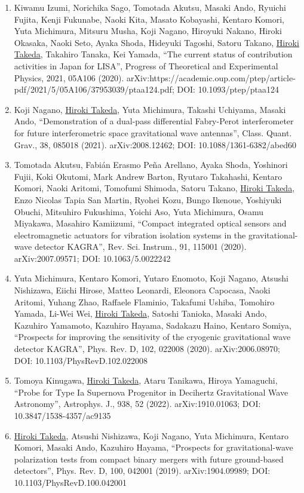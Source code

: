 \documentclass[uplatex, 11pt]{jsarticle}
\begin{document}
\begin{enumerate}
\item Kiwamu Izumi, Norichika Sago, Tomotada Akutsu, Masaki Ando, Ryuichi Fujita, Kenji Fukunabe, Naoki Kita, Masato Kobayashi, Kentaro Komori, Yuta Michimura, Mitsuru Musha, Koji Nagano, Hiroyuki Nakano, Hiroki Okasaka, Naoki Seto, Ayaka Shoda, Hideyuki Tagoshi, Satoru Takano, \uline{Hiroki Takeda}, Takahiro Tanaka, Kei Yamada, “The current status of contribution activities in Japan for LISA”, Progress of Theoretical and Experimental Physics, 2021, 05A106 (2020). arXiv:https://academic.oup.com/ptep/article-pdf/2021/5/05A106/37953039/ptaa124.pdf; DOI: 10.1093/ptep/ptaa124
\item Koji Nagano, \uline{Hiroki Takeda}, Yuta Michimura, Takashi Uchiyama, Masaki Ando, “Demonstration of a dual-pass differential Fabry-Perot interferometer for future interferometric space gravitational wave antennas”, Class. Quant. Grav., 38, 085018 (2021). arXiv:2008.12462; DOI: 10.1088/1361-6382/abed60
\item Tomotada Akutsu, Fabián Erasmo Peña Arellano, Ayaka Shoda, Yoshinori Fujii, Koki Okutomi, Mark Andrew Barton, Ryutaro Takahashi, Kentaro Komori, Naoki Aritomi, Tomofumi Shimoda, Satoru Takano, \uline{Hiroki Takeda}, Enzo Nicolas Tapia San Martin, Ryohei Kozu, Bungo Ikenoue, Yoshiyuki Obuchi, Mitsuhiro Fukushima, Yoichi Aso, Yuta Michimura, Osamu Miyakawa, Masahiro Kamiizumi, “Compact integrated optical sensors and electromagnetic actuators for vibration isolation systems in the gravitational-wave detector KAGRA”, Rev. Sci. Instrum., 91, 115001 (2020). arXiv:2007.09571; DOI: 10.1063/5.0022242
\item Yuta Michimura, Kentaro Komori, Yutaro Enomoto, Koji Nagano, Atsushi Nishizawa, Eiichi Hirose, Matteo Leonardi, Eleonora Capocasa, Naoki Aritomi, Yuhang Zhao, Raffaele Flaminio, Takafumi Ushiba, Tomohiro Yamada, Li-Wei Wei, \uline{Hiroki Takeda}, Satoshi Tanioka, Masaki Ando, Kazuhiro Yamamoto, Kazuhiro Hayama, Sadakazu Haino, Kentaro Somiya, “Prospects for improving the sensitivity of the cryogenic gravitational wave detector KAGRA”, Phys. Rev. D, 102, 022008 (2020). arXiv:2006.08970; DOI: 10.1103/PhysRevD.102.022008
\item Tomoya Kinugawa, \uline{Hiroki Takeda}, Ataru Tanikawa, Hiroya Yamaguchi, “Probe for Type Ia Supernova Progenitor in Decihertz Gravitational Wave Astronomy”, Astrophys. J., 938, 52 (2022). arXiv:1910.01063; DOI: 10.3847/1538-4357/ac9135
\item \uline{Hiroki Takeda}, Atsushi Nishizawa, Koji Nagano, Yuta Michimura, Kentaro Komori, Masaki Ando, Kazuhiro Hayama, “Prospects for gravitational-wave polarization tests from compact binary mergers with future ground-based detectors”, Phys. Rev. D, 100, 042001 (2019). arXiv:1904.09989; DOI: 10.1103/PhysRevD.100.042001

\end{enumerate}
\end{document}
